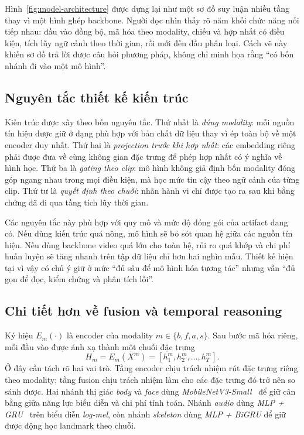 \documentclass[conference,a4paper]{IEEEtran}
\begin{document}
Hình~\ref{fig:model-architecture} được dựng lại như một sơ đồ suy luận nhiều tầng thay vì một hình ghép backbone. Người đọc nhìn thấy rõ năm khối chức năng nối tiếp nhau: đầu vào đồng bộ, mã hóa theo modality, chiếu và hợp nhất có điều kiện, tích lũy ngữ cảnh theo thời gian, rồi mới đến đầu phân loại. Cách vẽ này khiến sơ đồ trả lời được câu hỏi phương pháp, không chỉ minh họa rằng ``có bốn nhánh đi vào một mô hình''.

\subsection{Nguyên tắc thiết kế kiến trúc}
Kiến trúc được xây theo bốn nguyên tắc. Thứ nhất là \textit{đúng modality}: mỗi nguồn tín hiệu được giữ ở dạng phù hợp với bản chất dữ liệu thay vì ép toàn bộ về một encoder duy nhất. Thứ hai là \textit{projection trước khi hợp nhất}: các embedding riêng phải được đưa về cùng không gian đặc trưng để phép hợp nhất có ý nghĩa về hình học. Thứ ba là \textit{gating theo clip}: mô hình không giả định bốn modality đóng góp ngang nhau trong mọi điều kiện, mà học mức tin cậy theo ngữ cảnh của từng clip. Thứ tư là \textit{quyết định theo chuỗi}: nhãn hành vi chỉ được tạo ra sau khi bằng chứng đã đi qua tầng tích lũy thời gian.

Các nguyên tắc này phù hợp với quy mô và mức độ đóng gói của artifact đang có. Nếu dùng kiến trúc quá nông, mô hình sẽ bỏ sót quan hệ giữa các nguồn tín hiệu. Nếu dùng backbone video quá lớn cho toàn hệ, rủi ro quá khớp và chi phí huấn luyện sẽ tăng nhanh trên tập dữ liệu chỉ hơn hai nghìn mẫu. Thiết kế hiện tại vì vậy có chủ ý giữ ở mức ``đủ sâu để mô hình hóa tương tác'' nhưng vẫn ``đủ gọn để đọc, kiểm chứng và phân tích lỗi''.

\subsection{Chi tiết hơn về fusion và temporal reasoning}
Ký hiệu $E_m(\cdot)$ là encoder của modality $m \in \{b,f,a,s\}$. Sau bước mã hóa riêng, mỗi đầu vào được ánh xạ thành một chuỗi đặc trưng
\begin{equation}
H_m = E_m(X^m) = [h^m_1, h^m_2, \ldots, h^m_T].
\end{equation}
Ở đây cần tách rõ hai vai trò. Tầng encoder chịu trách nhiệm rút đặc trưng riêng theo modality; tầng fusion chịu trách nhiệm làm cho các đặc trưng đó trở nên so sánh được. Hai nhánh thị giác \textit{body} và \textit{face} dùng \textit{MobileNetV3-Small}~\cite{mobilenetv3} để giữ cân bằng giữa năng lực biểu diễn và chi phí tính toán. Nhánh \textit{audio} dùng \textit{MLP + GRU}~\cite{gru} trên biểu diễn \textit{log-mel}, còn nhánh \textit{skeleton} dùng \textit{MLP + BiGRU} để giữ được động học landmark theo chuỗi.
\end{document}
